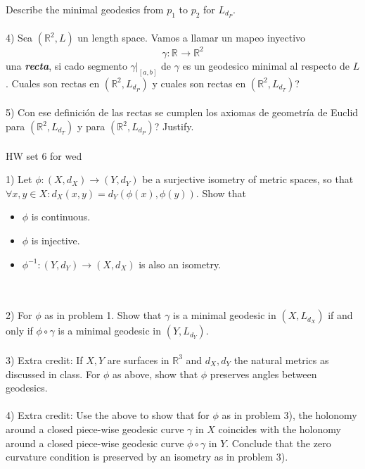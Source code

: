 \documentclass{amsart}
\begin{document}
Describe the minimal geodesics from $p _{1}$  to $p _{2}$ for $L _{d _{P}}$. 
\\\\
4) Sea $(\mathbb{R} ^{2}, L) $ un length space. Vamos
a llamar un mapeo inyectivo $$\gamma: \mathbb{R} ^{} \to
\mathbb{R} ^{2} $$ una \textbf{\emph{recta}}, si cado segmento $\gamma | _{[a,b]}$ de $\gamma$ es un geodesico minimal al respecto de $L$. Cuales son rectas en $(\mathbb{R} ^{2}, L _{d _{P}}) $
y cuales son rectas en $(\mathbb{R} ^{2}, L _{d _{T}}) $?
\\\\
5) Con ese definición de las rectas se cumplen los axiomas de geometría de Euclid para $(\mathbb{R} ^{2}, L _{d _{T}}) $ y para $(\mathbb{R} ^{2}, L _{d _{P}}) $? Justify.
\\\\
HW set 6 for wed

1) Let $\phi: (X, d _{X}) \to (Y, d _{Y})$ be a surjective
isometry of metric spaces, so that $\forall x,y \in X:
d _{X} (x, y) = d _{Y} (\phi (x), \phi (y))$. Show that
\begin{itemize}
\item  $\phi $ is continuous.
\item  $\phi $ is injective.
\item $\phi ^{-1}: (Y, d _{Y}) \to (X, d _{X}) $ is also an
isometry.
\end{itemize}
\\\\
2) For $\phi $ as in problem 1. Show that $\gamma $ is
a minimal geodesic in $(X, L _{d _{X}})$ if and only if
$\phi \circ \gamma $ is a minimal geodesic in $(Y, L _{d _{Y}})$.
\\\\
3) Extra credit: If $X,Y$ are surfaces in $\mathbb{R} ^{3} $ and $d _{X},
d _{Y}$ the natural metrics as discussed in class. For $\phi $ as above, show that $\phi $ preserves angles between geodesics. 
\\\\
4) Extra credit: Use the above to show that for $\phi $ as
in problem 3), 
the holonomy around a closed piece-wise geodesic curve
$\gamma $ in $X$ coincides with the holonomy around a closed
piece-wise geodesic curve $\phi \circ \gamma $ in $Y$.
Conclude that the zero curvature condition is preserved by
an isometry as in problem 3).
\end{document}
